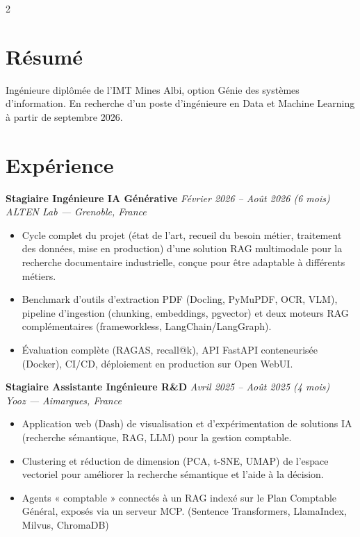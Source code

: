 \documentclass[10.5pt,a4paper]{article}
\newcommand{\sectionrule}{\vspace{-6pt}{\color{accent}\hrule height 1pt}\vspace{3pt}}
\newcommand{\cvexp}[5]{%
  \noindent\textbf{#1} \hfill {\itshape\color{graytext}\small #4}\\
  {\itshape #2 --- #3}\\[-2pt]
  #5
  \vspace{10pt}
}
\begin{document}
\setlength{\columnsep}{1.5em}
\begin{paracol}{2}

\section*{Résumé}
\sectionrule
\justifying
Ingénieure diplômée de l'IMT Mines Albi, option Génie des systèmes d'information. En recherche d'un poste d'ingénieure en Data et Machine Learning à partir de septembre 2026.

\section*{Expérience}
\sectionrule

\cvexp{Stagiaire Ingénieure IA Générative}{ALTEN Lab}{Grenoble, France}{Février 2026 -- Août 2026 (6 mois)}{%
  \begin{itemize}[leftmargin=12pt, itemsep=2pt, topsep=0pt, partopsep=0pt, parsep=0pt]
    \item Cycle complet du projet (état de l'art, recueil du besoin métier, traitement des données, mise en production) d'une solution RAG multimodale pour la recherche documentaire industrielle, conçue pour être adaptable à différents métiers.
    \item Benchmark d'outils d'extraction PDF (Docling, PyMuPDF, OCR, VLM), pipeline d'ingestion (chunking, embeddings, pgvector) et deux moteurs RAG complémentaires (frameworkless, LangChain/\allowbreak LangGraph).
    \item Évaluation complète (RAGAS, recall@k), API FastAPI conteneurisée (Docker), CI/CD, déploiement en production sur Open WebUI.
  \end{itemize}
}

\cvexp{Stagiaire Assistante Ingénieure R\&D}{Yooz}{Aimargues, France}{Avril 2025 -- Août 2025 (4 mois)}{%
  \begin{itemize}[leftmargin=12pt, itemsep=2pt, topsep=0pt, partopsep=0pt, parsep=0pt]
    \item Application web (Dash) de visualisation et d'expérimentation de solutions IA (recherche sémantique, RAG, LLM) pour la gestion comptable.
    \item Clustering et réduction de dimension (PCA, t-SNE, UMAP) de l'espace vectoriel pour améliorer la recherche sémantique et l'aide à la décision.
    \item Agents « comptable » connectés à un RAG indexé sur le Plan Comptable Général, exposés via un serveur MCP. (Sentence Transformers, LlamaIndex, Milvus, ChromaDB)
  \end{itemize}
}


\end{paracol}
\end{document}
